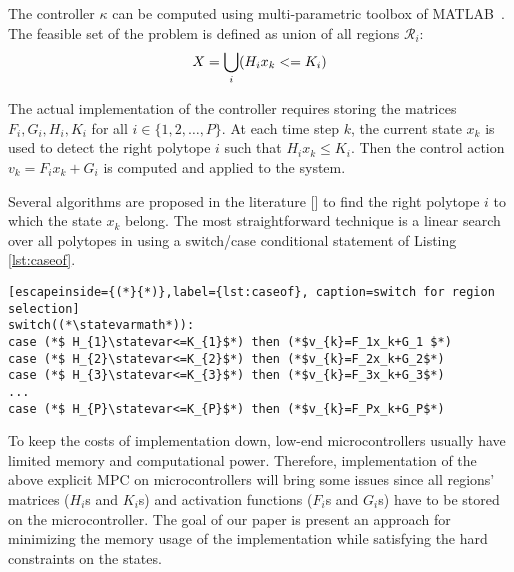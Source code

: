 
The controller $\kappa$ can be computed using multi-parametric toolbox of MATLAB~\cite{matlabMPT, matlabYALMIP}. The feasible set of the problem is defined as union of all regions $\mathcal{R}_{i}$:
\begin{equation}
X = \bigcup_{i}(H_{i}x_{k}<=K_{i})
\end{equation}


The actual implementation of the controller requires storing the matrices $F_i,G_i,H_i,K_i$ for all $i\in\{1,2,\ldots,P\}$. At each time step $k$, the current state $x_k$ is used to detect the right polytope $i$ such that $H_i x_k\le K_i$. Then the control action $v_k = F_i x_k + G_i$ is computed and applied to the system.

Several algorithms are proposed in the literature [\cite{Mnnigmann:2011,Jones:2006}] to find the right polytope $i$ to which the state $x_k$ belong. The most straightforward technique is a linear search over all polytopes in \statespace\space using a switch/case conditional statement of Listing \ref{lst:caseof}.

\begin{lstlisting}[escapeinside={(*}{*)},label={lst:caseof}, caption=switch for region selection]
switch((*\statevarmath*)):
case (*$ H_{1}\statevar<=K_{1}$*) then (*$v_{k}=F_1x_k+G_1 $*)
case (*$ H_{2}\statevar<=K_{2}$*) then (*$v_{k}=F_2x_k+G_2$*)
case (*$ H_{3}\statevar<=K_{3}$*) then (*$v_{k}=F_3x_k+G_3$*)
...
case (*$ H_{P}\statevar<=K_{P}$*) then (*$v_{k}=F_Px_k+G_P$*)
\end{lstlisting}

To keep the costs of implementation down, low-end microcontrollers usually have limited memory and computational power. Therefore, implementation of the above explicit MPC on microcontrollers will bring some issues since all regions' matrices ($H_i$s and $K_i$s) and activation functions ($F_i$s and $G_i$s) have to be stored on the microcontroller. The goal of our paper is present an approach for minimizing the memory usage of the implementation while satisfying the hard constraints on the states. 
